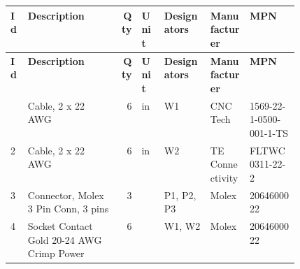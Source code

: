 \begingroup\small\setlength{\tabcolsep}{5pt}
\begin{longtable}{@{}l >{\raggedright\arraybackslash}p{0.32\linewidth} r l >{\raggedright\arraybackslash}p{0.16\linewidth} l l@{}}
\toprule
\textbf{Id} & \textbf{Description} & \textbf{Qty} & \textbf{Unit} & \textbf{Designators} & \textbf{Manufacturer} & \textbf{MPN} \\
\midrule
\endfirsthead
\toprule
\textbf{Id} & \textbf{Description} & \textbf{Qty} & \textbf{Unit} & \textbf{Designators} & \textbf{Manufacturer} & \textbf{MPN} \\
\midrule
\endhead
\bottomrule
\endfoot
1 & Cable, 2 x 22 AWG & 6 & in & W1 & CNC Tech & 1569-22-1-0500-001-1-TS \\
2 & Cable, 2 x 22 AWG & 6 & in & W2 & TE Connectivity & FLTWC0311-22-2 \\
3 & Connector, Molex 3 Pin Conn, 3 pins & 3 &  & P1, P2, P3 & Molex & 2064600022 \\
4 & Socket Contact Gold 20-24 AWG Crimp Power & 6 &  & W1, W2 & Molex & 2064600022 \\
\end{longtable}\endgroup
